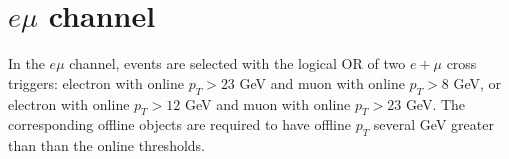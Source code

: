 \section{$e\mu$ channel}

In the $e\mu$ channel, events are selected with the logical OR of two $e+\mu$ cross triggers: electron with online $p_{T} > 23$ GeV and muon with online $p_{T} > 8$ GeV, or electron with online $p_{T} > 12$ GeV and muon with online $p_{T}>23$ GeV. The corresponding offline objects are required to have offline $p_{T}$ several GeV greater than than the online thresholds.